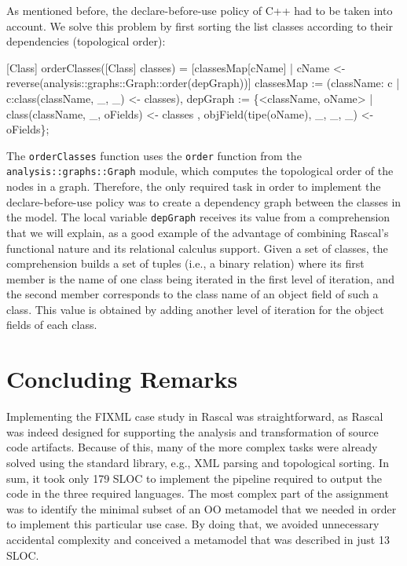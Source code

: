 \documentclass[submission,copyright,creativecommons]{eptcs}
\begin{document}
As  mentioned before, the declare-before-use policy of C++ had to be taken into account.
We solve this problem by first sorting the list classes according to their dependencies (topological order): 

\begin{rascal}
[Class] orderClasses([Class] classes) =
    {}[classesMap{}[cName] | cName \textless{}- reverse(analysis::graphs::Graph::order(depGraph))]
     classesMap := (className: c | c:class(className, \_{}, \_{}) \textless{}- classes),
         depGraph := \{{}\textless{}className, oName\textgreater{} | class(className, \_{}, oFields) \textless{}- classes
                                         , objField(tipe(oName), \_{}, \_{}, \_{}) \textless{}- oFields\}{};
\end{rascal}

The \texttt{orderClasses} function uses the \texttt{order} function from the \texttt{analysis::graphs::Graph} module, which computes the topological order of the nodes in a graph. Therefore, the only required task in order to implement the declare-before-use policy was to create a dependency graph between the classes in the model.  The local variable \texttt{depGraph} receives its value from a comprehension that we will explain, as a good example of the advantage of combining Rascal's functional nature and its relational calculus support. Given a set of classes, the comprehension builds a set of tuples (i.e., a binary relation) where its first member is the name of one class being iterated in the first level of iteration, and the second member corresponds to the class name of an object field of such a class. This value is obtained by adding another level of iteration for the object fields of each class.

\section{Concluding Remarks}
Implementing the FIXML case study in Rascal was straightforward, as Rascal was indeed designed for supporting the analysis and transformation of source code artifacts. Because of this, many of the more complex tasks were already solved using the standard library, e.g., XML parsing and topological sorting. In sum, it took only 179 SLOC to implement the pipeline required to output the code in the three required languages. The most complex part of the assignment was to identify the minimal subset of an OO metamodel that we needed in order to implement this particular use case. By doing that, we avoided unnecessary accidental complexity and conceived a metamodel that was described in just 13 SLOC.



\end{document}
